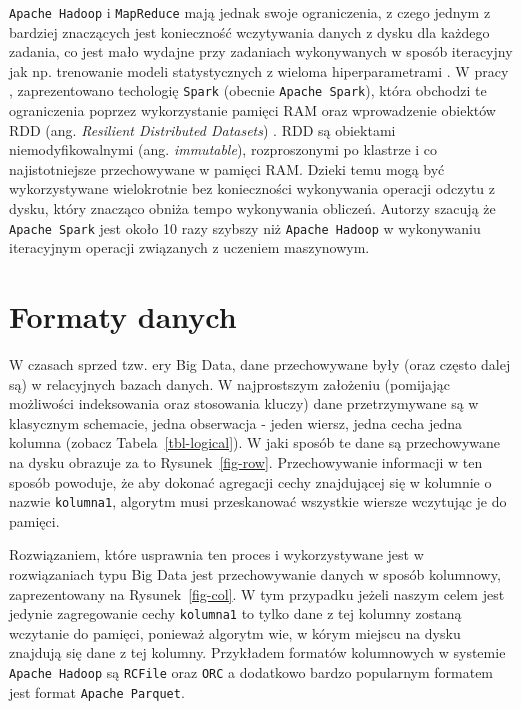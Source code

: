 \documentclass[
  letterpaper,
  DIV=11,
  numbers=noendperiod]{scrreprt}
\begin{document}
\texttt{Apache\ Hadoop} i \texttt{MapReduce} mają jednak swoje
ograniczenia, z czego jednym z bardziej znaczących jest konieczność
wczytywania danych z dysku dla każdego zadania, co jest mało wydajne
przy zadaniach wykonywanych w sposób iteracyjny jak np. trenowanie
modeli statystycznych z wieloma hiperparametrami \autocite{spark_2010}.
W pracy \textcite{spark_2010}, zaprezentowano techologię \texttt{Spark}
(obecnie \texttt{Apache\ Spark}), która obchodzi te ograniczenia poprzez
wykorzystanie pamięci RAM oraz wprowadzenie obiektów RDD (ang.
\emph{Resilient Distributed Datasets}) \autocite{rdd_2012}. RDD są
obiektami niemodyfikowalnymi (ang. \emph{immutable}), rozproszonymi po
klastrze i co najistotniejsze przechowywane w pamięci RAM. Dzieki temu
mogą być wykorzystywane wielokrotnie bez konieczności wykonywania
operacji odczytu z dysku, który znacząco obniża tempo wykonywania
obliczeń. Autorzy \textcite{spark_2010} szacują że
\texttt{Apache\ Spark} jest około 10 razy szybszy niż
\texttt{Apache\ Hadoop} w wykonywaniu iteracyjnym operacji związanych z
uczeniem maszynowym.

\hypertarget{formaty-danych}{%
\section*{Formaty danych}\label{formaty-danych}}


W czasach sprzed tzw. ery Big Data, dane przechowywane były (oraz często
dalej są) w relacyjnych bazach danych. W najprostszym założeniu
(pomijając możliwości indeksowania oraz stosowania kluczy) dane
przetrzymywane są w klasycznym schemacie, jedna obserwacja - jeden
wiersz, jedna cecha jedna kolumna (zobacz Tabela~\ref{tbl-logical}). W
jaki sposób te dane są przechowywane na dysku obrazuje za to
Rysunek~\ref{fig-row}. Przechowywanie informacji w ten sposób powoduje,
że aby dokonać agregacji cechy znajdującej się w kolumnie o nazwie
\texttt{kolumna1}, algorytm musi przeskanować wszystkie wiersze
wczytując je do pamięci.

Rozwiązaniem, które usprawnia ten proces i wykorzystywane jest w
rozwiązaniach typu Big Data jest przechowywanie danych w sposób
kolumnowy, zaprezentowany na Rysunek~\ref{fig-col}. W tym przypadku
jeżeli naszym celem jest jedynie zagregowanie cechy \texttt{kolumna1} to
tylko dane z tej kolumny zostaną wczytanie do pamięci, ponieważ algorytm
wie, w kórym miejscu na dysku znajdują się dane z tej kolumny.
Przykładem formatów kolumnowych w systemie \texttt{Apache\ Hadoop} są
\texttt{RCFile} oraz \texttt{ORC} a dodatkowo bardzo popularnym formatem
jest format \texttt{Apache\ Parquet}.
\end{document}
